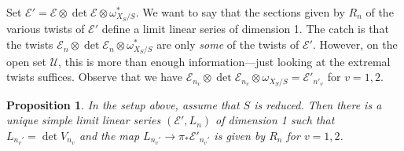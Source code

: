 \documentclass[11pt,reqno]{amsart}
\theoremstyle{plain}
\newtheorem{proposition}[theorem]{Proposition}
\theoremstyle{definition}
\theoremstyle{remark}
\numberwithin{equation}{section}
\renewcommand{\to}{{\longrightarrow}}
\numberwithin{equation}{section}
\begin{document}
Set $\mathcal E' = \mathcal E \otimes \det \mathcal E \otimes \omega^*_{X_S/S}$.
We want to say that the sections given by $R_n$ of the various twists of $\mathcal E'$ define a limit linear series of dimension 1.
The catch is that the twists $\mathcal E_n \otimes \det \mathcal E_n \otimes \omega_{X_S/S}^*$ are only \emph{some} of the twists of $\mathcal E'$.
However, on the open set $\mathcal U$, this is more than enough information---just looking at the extremal twists suffices.
Observe that we have $\mathcal E_{n_v} \otimes \det \mathcal E_{n_v} \otimes \omega_{X_S/S} = \mathcal E'_{n'_v}$ for $v = 1,2$.
\begin{proposition}\label{prop:mapreduced}
  In the setup above, assume that $S$ is reduced.
  Then there is a unique simple limit linear series $(\mathcal E', L_n)$ of dimension 1 such that $L_{n_v'} = \det V_{n_v}$ and the map $L_{n_v'} \to \pi_* \mathcal E'_{n_v'}$ is given by $R_n$ for $v = 1,2$.
\end{proposition}
\end{document}
